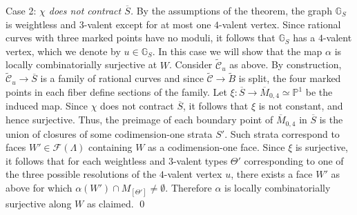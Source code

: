 \documentclass[11pt,reqno]{amsart}
\numberwithin{equation}{section}
\theoremstyle{definition}
\newcommand{\PP}{{\mathbb P}}
\newcommand{\GG}{{\mathbb G}}
\def\:{\colon}
\newcommand{\cC}{{\mathcal{C}}}
\theoremstyle{remark}
\begin{document}
Case 2: {\em $\chi$ does not contract $\overline S$.} By the assumptions of the theorem, the graph $\GG_{S}$ is weightless and $3$-valent except for at most one $4$-valent vertex. Since rational curves with three marked points have no moduli, it follows that $\GG_{S}$ has a $4$-valent vertex, which we denote by $u\in\GG_{S}$. In this case we will show that the map $\alpha$ is locally combinatorially surjective at $W$. Consider $\widetilde \cC_u$ as above. By construction, $\widetilde \cC_u\to \overline S$ is a family of rational curves and since $\widetilde \cC \to \widetilde B$ is split, the four marked points in each fiber define sections of the family. Let $\xi\:\overline S \to \overline M_{0, 4}\simeq \PP^1$ be the induced map. Since $\chi$ does not contract $\overline S$, it follows that  $\xi$ is not constant, and hence surjective. Thus, the preimage of each boundary point of $\overline M_{0,4}$ in $\overline S$ is the union of closures of some codimension-one strata $S'$. Such strata correspond to faces $W'\in\mathcal F(\Lambda)$ containing $W$ as a codimension-one face. Since $\xi$ is surjective, it follows that for each weightless and $3$-valent types $\Theta'$ corresponding to one of the three possible resolutions of the $4$-valent vertex $u$, there exists a face $W'$ as above for which $\alpha(W')\cap M_{[\Theta']}\neq \emptyset$. Therefore $\alpha$ is locally combinatorially surjective along $W$ as claimed.
\qed






\end{document}
